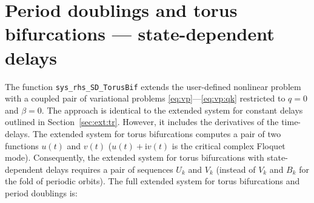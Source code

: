 \documentclass[11pt]{scrartcl}
\newcommand{\mt}[1]{\mathrm{#1}}
\renewcommand{\i}{\mt{i}}
\newcommand{\mlvar}[1]{\lstinline[keywordstyle=\color{var}]!#1!}
\begin{document}
\section{Period doublings and torus bifurcations --- state-dependent
  delays}
\label{sec:sd:tr}
The function \mlvar{sys_rhs_SD_TorusBif} extends the user-defined
nonlinear problem with a coupled pair of variational problems
\eqref{eq:vp}---\eqref{eq:vp:qk} restricted to $q=0$ and
$\beta=0$. The approach is identical to the extended system for
constant delays outlined in Section~\ref{sec:ext:tr}. However, it
includes the derivatives of the time-delays. The extended system for
torus bifurcations computes a pair of two functions $u(t)$ and $v(t)$
($u(t)+\i v(t)$ is the critical complex Floquet mode). Consequently,
the extended system for torus bifurcations with state-dependent delays
requires a pair of sequences $U_k$ and $V_k$ (instead of $V_k$ and
$B_k$ for the fold of periodic orbits). The full extended system for
torus bifurcations and period doublings is:
\end{document}
